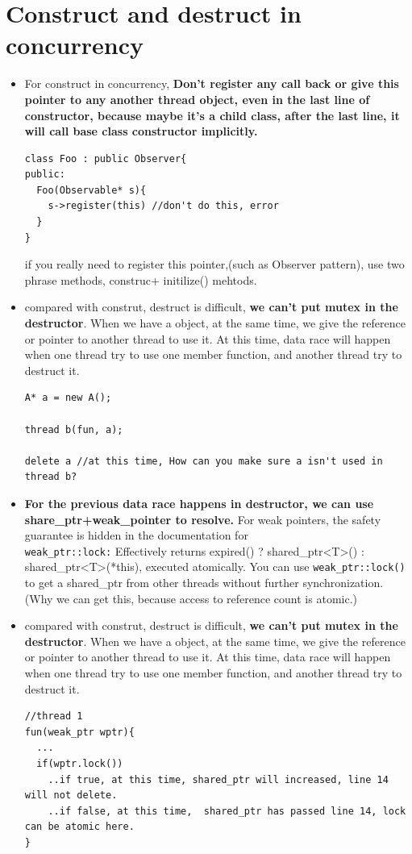 \documentclass[a4paper,11pt,twoside]{book}
\begin{document}
\section{Construct and destruct in concurrency}
\begin{itemize}

	\item For construct in concurrency, \textbf{Don't register any call back or give this pointer to any another thread object, even in the last line of constructor, because maybe it's a child class, after the last line, it will call base class constructor implicitly.}
\begin{lstlisting}
class Foo : public Observer{
public:
  Foo(Observable* s){
    s->register(this) //don't do this, error
  }
}
\end{lstlisting}
if you really need to register this pointer,(such as Observer pattern),  use two phrase methods, construc+ initilize() mehtods.

    \item compared with construt, destruct is difficult, \textbf{we can't put mutex in the destructor}. When we have a object, at the same time, we give the reference or pointer to another thread to use it. At this time, data race will happen when one thread try to use one member function, and another thread try to destruct it. 
\begin{lstlisting}[]
A* a = new A();

thread b(fun, a);

delete a //at this time, How can you make sure a isn't used in thread b? 
\end{lstlisting}

		\item \textbf{For the previous data race happens in destructor, we can use share\_ptr+weak\_pointer to resolve.} For weak pointers, the safety guarantee is hidden in the documentation for \\ \texttt{weak\_ptr::lock:} Effectively returns expired() ? shared\_ptr<T>() : shared\_ptr<T>(*this), executed atomically.  You can use \texttt{weak\_ptr::lock()} to get a shared\_ptr from other threads without further synchronization. (Why we can get this, because access to reference count is atomic.) 
        
    \item compared with construt, destruct is difficult, \textbf{we can't put mutex in the destructor}. When we have a object, at the same time, we give the reference or pointer to another thread to use it. At this time, data race will happen when one thread try to use one member function, and another thread try to destruct it. 
\begin{lstlisting}[]
//thread 1
fun(weak_ptr wptr){
  ...
  if(wptr.lock())
    ..if true, at this time, shared_ptr will increased, line 14 will not delete.
    ..if false, at this time,  shared_ptr has passed line 14, lock can be atomic here. 
}


\end{lstlisting}
\end{itemize}
\end{document}
